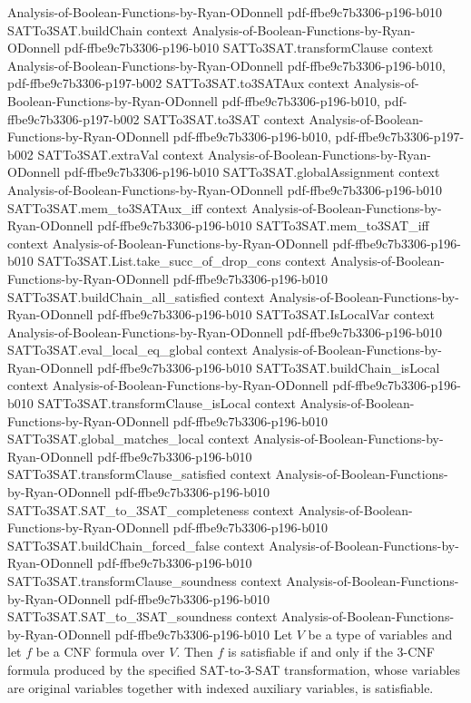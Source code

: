 \begin{theorem}
  {Analysis-of-Boolean-Functions-by-Ryan-ODonnell}
  {pdf-ffbe9c7b3306-p196-b010}
\proofstep
  {SATTo3SAT.buildChain}
  {context}
  {Analysis-of-Boolean-Functions-by-Ryan-ODonnell}
  {pdf-ffbe9c7b3306-p196-b010}
\proofstep
  {SATTo3SAT.transformClause}
  {context}
  {Analysis-of-Boolean-Functions-by-Ryan-ODonnell}
  {pdf-ffbe9c7b3306-p196-b010,
    pdf-ffbe9c7b3306-p197-b002}
\proofstep
  {SATTo3SAT.to3SATAux}
  {context}
  {Analysis-of-Boolean-Functions-by-Ryan-ODonnell}
  {pdf-ffbe9c7b3306-p196-b010,
    pdf-ffbe9c7b3306-p197-b002}
\proofstep
  {SATTo3SAT.to3SAT}
  {context}
  {Analysis-of-Boolean-Functions-by-Ryan-ODonnell}
  {pdf-ffbe9c7b3306-p196-b010,
    pdf-ffbe9c7b3306-p197-b002}
\proofstep
  {SATTo3SAT.extraVal}
  {context}
  {Analysis-of-Boolean-Functions-by-Ryan-ODonnell}
  {pdf-ffbe9c7b3306-p196-b010}
\proofstep
  {SATTo3SAT.globalAssignment}
  {context}
  {Analysis-of-Boolean-Functions-by-Ryan-ODonnell}
  {pdf-ffbe9c7b3306-p196-b010}
\proofstep
  {SATTo3SAT.mem_to3SATAux_iff}
  {context}
  {Analysis-of-Boolean-Functions-by-Ryan-ODonnell}
  {pdf-ffbe9c7b3306-p196-b010}
\proofstep
  {SATTo3SAT.mem_to3SAT_iff}
  {context}
  {Analysis-of-Boolean-Functions-by-Ryan-ODonnell}
  {pdf-ffbe9c7b3306-p196-b010}
\proofstep
  {SATTo3SAT.List.take_succ_of_drop_cons}
  {context}
  {Analysis-of-Boolean-Functions-by-Ryan-ODonnell}
  {pdf-ffbe9c7b3306-p196-b010}
\proofstep
  {SATTo3SAT.buildChain_all_satisfied}
  {context}
  {Analysis-of-Boolean-Functions-by-Ryan-ODonnell}
  {pdf-ffbe9c7b3306-p196-b010}
\proofstep
  {SATTo3SAT.IsLocalVar}
  {context}
  {Analysis-of-Boolean-Functions-by-Ryan-ODonnell}
  {pdf-ffbe9c7b3306-p196-b010}
\proofstep
  {SATTo3SAT.eval_local_eq_global}
  {context}
  {Analysis-of-Boolean-Functions-by-Ryan-ODonnell}
  {pdf-ffbe9c7b3306-p196-b010}
\proofstep
  {SATTo3SAT.buildChain_isLocal}
  {context}
  {Analysis-of-Boolean-Functions-by-Ryan-ODonnell}
  {pdf-ffbe9c7b3306-p196-b010}
\proofstep
  {SATTo3SAT.transformClause_isLocal}
  {context}
  {Analysis-of-Boolean-Functions-by-Ryan-ODonnell}
  {pdf-ffbe9c7b3306-p196-b010}
\proofstep
  {SATTo3SAT.global_matches_local}
  {context}
  {Analysis-of-Boolean-Functions-by-Ryan-ODonnell}
  {pdf-ffbe9c7b3306-p196-b010}
\proofstep
  {SATTo3SAT.transformClause_satisfied}
  {context}
  {Analysis-of-Boolean-Functions-by-Ryan-ODonnell}
  {pdf-ffbe9c7b3306-p196-b010}
\proofstep
  {SATTo3SAT.SAT_to_3SAT_completeness}
  {context}
  {Analysis-of-Boolean-Functions-by-Ryan-ODonnell}
  {pdf-ffbe9c7b3306-p196-b010}
\proofstep
  {SATTo3SAT.buildChain_forced_false}
  {context}
  {Analysis-of-Boolean-Functions-by-Ryan-ODonnell}
  {pdf-ffbe9c7b3306-p196-b010}
\proofstep
  {SATTo3SAT.transformClause_soundness}
  {context}
  {Analysis-of-Boolean-Functions-by-Ryan-ODonnell}
  {pdf-ffbe9c7b3306-p196-b010}
\proofstep
  {SATTo3SAT.SAT_to_3SAT_soundness}
  {context}
  {Analysis-of-Boolean-Functions-by-Ryan-ODonnell}
  {pdf-ffbe9c7b3306-p196-b010}
Let $V$ be a type of variables and let $f$ be a CNF formula over $V$. Then $f$ is
satisfiable if and only if the 3-CNF formula produced by the specified SAT-to-3-SAT
transformation, whose variables are original variables together with indexed auxiliary
variables, is satisfiable.
\end{theorem}


